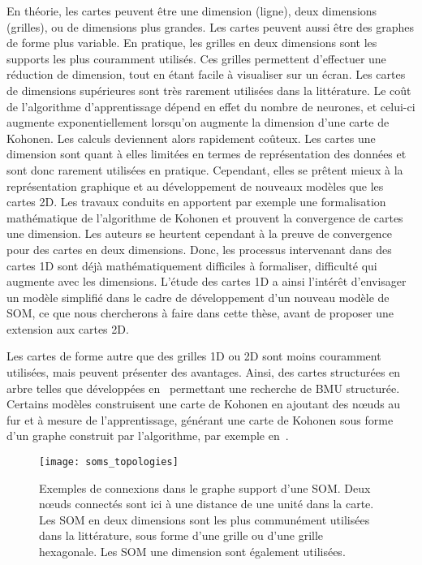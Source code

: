 \documentclass[../main]{subfiles}
\begin{document}
En théorie, les cartes peuvent être une dimension (ligne), deux dimensions (grilles), ou de dimensions plus grandes. Les cartes peuvent aussi être des graphes de forme plus variable. 
En pratique, les grilles en deux dimensions sont les supports les plus couramment utilisés. Ces grilles permettent d'effectuer une réduction de dimension, tout en étant facile à visualiser sur un écran. Les cartes de dimensions supérieures sont très rarement utilisées dans la littérature. Le coût de l'algorithme d'apprentissage dépend en effet du nombre de neurones, et celui-ci augmente exponentiellement lorsqu'on augmente la dimension d'une carte de Kohonen. Les calculs deviennent alors rapidement coûteux.
Les cartes une dimension sont quant à elles limitées en termes de représentation des données et sont donc rarement utilisées en pratique. Cependant, elles se prêtent mieux à la représentation graphique et au développement de nouveaux modèles que les cartes 2D.
Les travaux conduits en \cite{cottrell_theoretical_2016,fort_soms_2006} apportent par exemple une formalisation mathématique de l'algorithme de Kohonen et prouvent la convergence de cartes une dimension. Les auteurs se heurtent cependant à la preuve de convergence pour des cartes en deux dimensions. Donc, les processus intervenant dans des cartes 1D sont déjà mathématiquement difficiles à formaliser, difficulté qui augmente avec les dimensions.
L'étude des cartes 1D a ainsi l'intérêt d'envisager un modèle simplifié dans le cadre de développement d'un nouveau modèle de SOM, ce que nous chercherons à faire dans cette thèse, avant de proposer une extension aux cartes 2D.

Les cartes de forme autre que des grilles 1D ou 2D sont moins couramment utilisées, mais peuvent présenter des avantages. Ainsi, des cartes structurées en arbre telles que développées en~\cite{koikkalainen_self-organizing_1990} permettant une recherche de BMU structurée. Certains modèles construisent une carte de Kohonen en ajoutant des n\oe{}uds au fur et à mesure de l'apprentissage, générant une carte de Kohonen sous forme d'un graphe construit par l'algorithme, par exemple en~\cite{alahakoon_dynamic_2000, yamaguchi_adaptive_2010}.

\begin{figure}
\centering
\texttt{[image: soms\_topologies]}
\caption{Exemples de connexions dans le graphe support d'une SOM. Deux n\oe{}uds connectés sont ici à une distance de une unité dans la carte.
Les SOM en deux dimensions sont les plus communément utilisées dans la littérature, sous forme d'une grille ou d'une grille hexagonale. Les SOM une dimension sont également utilisées. \label{fig:topo}}

\end{figure}
\end{document}
